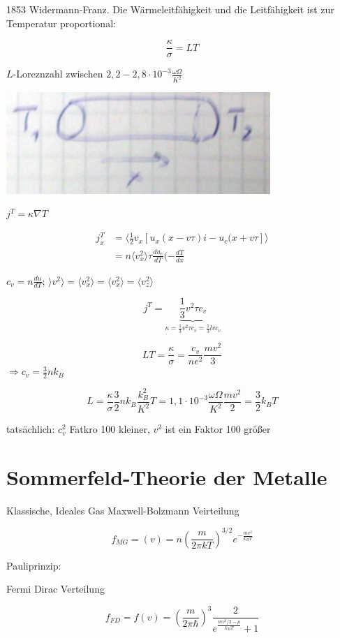 1853 Widermann-Franz. Die Wärmeleitfähigkeit und die Leitfähigkeit ist zur Temperatur proportional:

\[ \frac{\kappa}{\sigma} = LT\]

\(L\)-Loreznzahl zwischen \(2,2-2,8\cdot 10^{-3}\frac{\omega\Omega}{K^2}\)

\includegraphics[width=0.75\textwidth]{kap06_22.png}

\(j^T = \kappa \nabla T\)

\begin{align}
j^T_x &= \langle \frac{1}{2}v_x [u_x(x-v\tau)i-u_c(x+v\tau]\rangle \\
&= n\langle v_x^2\rangle \tau \frac{du_e}{dT}(-\frac{dT}{dx}
\end{align}

\(c_v = n\frac{du}{dT}\); \(\rangle v^2\rangle  = \langle v_x^2\rangle = \langle v^2_x\rangle =\langle v_z^2\rangle \)

\[ j^T = \underbrace{\frac{1}{3}v^2\tau c_v}_{\kappa = \frac{1}{3}v^2\tau c_v=\frac{1}{3}lvc_v} \]

\[ LT =  \frac{\kappa}{\sigma} = \frac{c_v}{ne^2} \frac{mv^2}{3} \]
\(\Rightarrow c_v = \frac{3}{2} nk_B\)

\[ L =\frac{\kappa}{\sigma}\frac{3}{2} nk_B \frac{k^2_B}{K^2} T = 1,1\cdot 10^{-3}\frac{\omega\Omega}{K^2}\frac{mv^2}{2} = \frac{3}{2}k_B T\]

tatsächlich: \(c^2_v\) Fatkro 100 kleiner, \(v^2\) ist ein Faktor 100 größer



\section{Sommerfeld-Theorie der Metalle}

Klassische, Ideales Gas Maxwell-Bolzmann Veirteilung

\[ f_{MG} = (v) = n\left(\frac{m}{2\pi kT}\right)^{3/2}e^{-\frac{mv^2}{k_B T}} \]

Pauliprinzip:

Fermi Dirac Verteilung

\[ f_{FD} = f(v) = \left(\frac{m}{2\pi \hbar}\right)^3 \frac{2}{e^{\frac{mv^2/2-\mu}{k_BT}}+1} \]

